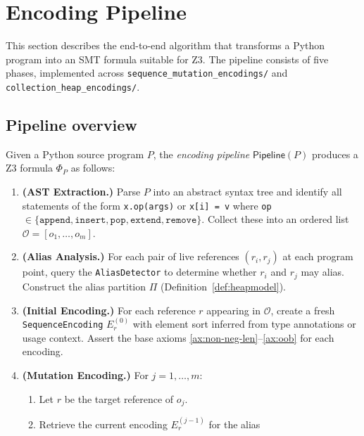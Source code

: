 \documentclass[11pt]{article}
\begin{document}
\section{Encoding Pipeline}\label{sec:pipeline}

This section describes the end-to-end algorithm that transforms a Python
program into an SMT formula suitable for Z3.  The pipeline consists of five
phases, implemented across \texttt{sequence\_mutation\_encodings/} and
\texttt{collection\_heap\_encodings/}.

\subsection{Pipeline overview}

\begin{construction}\label{con:pipeline}
Given a Python source program $P$, the \emph{encoding pipeline}
$\mathsf{Pipeline}(P)$ produces a Z3 formula $\Phi_P$ as follows:
\begin{enumerate}[label=\textbf{Phase~\arabic*},leftmargin=3.5em,nosep]
  \item \textbf{(AST Extraction.)} Parse $P$ into an abstract syntax tree
        and identify all statements of the form \texttt{x.op(args)} or
        \texttt{x[i] = v} where \texttt{op} $\in \{\texttt{append},
        \texttt{insert}, \texttt{pop}, \texttt{extend}, \texttt{remove}\}$.
        Collect these into an ordered list
        $\mathcal{O} = [o_1, \ldots, o_m]$.
  \item \textbf{(Alias Analysis.)} For each pair of live references
        $(r_i, r_j)$ at each program point, query the \texttt{AliasDetector}
        to determine whether $r_i$ and $r_j$ may alias.  Construct the alias
        partition $\Pi$ (Definition~\ref{def:heapmodel}).
  \item \textbf{(Initial Encoding.)} For each reference $r$ appearing in
        $\mathcal{O}$, create a fresh \texttt{SequenceEncoding}
        $E_r^{(0)}$ with element sort inferred from type annotations or
        usage context.  Assert the base axioms
        \eqref{ax:non-neg-len}--\eqref{ax:oob} for each encoding.
  \item \textbf{(Mutation Encoding.)} For $j = 1, \ldots, m$:
        \begin{enumerate}[label=(\alph*),nosep]
          \item Let $r$ be the target reference of $o_j$.
          \item Retrieve the current encoding $E_r^{(j-1)}$ for the alias

\end{enumerate}
\end{enumerate}
\end{construction}
\end{document}
